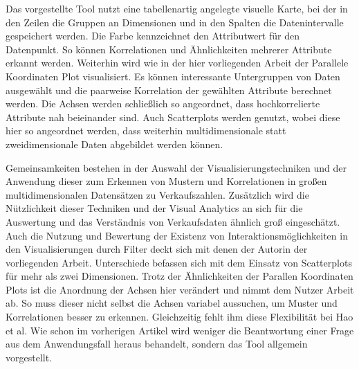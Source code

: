 \documentclass[usegeometry=true]{scrartcl}
\begin{document}
Das vorgestellte Tool nutzt eine tabellenartig angelegte visuelle Karte, bei der in den Zeilen die Gruppen an Dimensionen und in den Spalten die Datenintervalle gespeichert werden.
Die Farbe kennzeichnet den Attributwert für den Datenpunkt. So können Korrelationen und Ähnlichkeiten mehrerer Attribute erkannt werden.
Weiterhin wird wie in der hier vorliegenden Arbeit der Parallele Koordinaten Plot visualisiert. 
Es können interessante Untergruppen von Daten ausgewählt und die paarweise Korrelation der gewählten Attribute berechnet werden. 
Die Achsen werden schließlich so angeordnet, dass hochkorrelierte Attribute nah beieinander sind. 
Auch Scatterplots werden genutzt, wobei diese hier so angeordnet werden, dass weiterhin multidimensionale statt zweidimensionale Daten abgebildet werden können.

Gemeinsamkeiten bestehen in der Auswahl der Visualisierungstechniken und der Anwendung dieser zum Erkennen von Mustern und Korrelationen in großen multidimensionalen Datensätzen zu Verkaufszahlen.
Zusätzlich wird die Nützlichkeit dieser Techniken und der Visual Analytics an sich für die Auswertung und das Verständnis von Verkaufsdaten ähnlich groß eingeschätzt.
Auch die Nutzung und Bewertung der Existenz von Interaktionsmöglichkeiten in den Visualisierungen durch Filter deckt sich mit denen der Autorin der vorliegenden Arbeit.
Unterschiede befassen sich mit dem Einsatz von Scatterplots für mehr als zwei Dimensionen.
Trotz der Ähnlichkeiten der Parallen Koordinaten Plots ist die Anordnung der Achsen hier verändert und nimmt dem Nutzer Arbeit ab. 
So muss dieser nicht selbst die Achsen variabel aussuchen, um Muster und Korrelationen besser zu erkennen. 
Gleichzeitig fehlt ihm diese Flexibilität bei Hao et al.
Wie schon im vorherigen Artikel wird weniger die Beantwortung einer Frage aus dem Anwendungsfall heraus behandelt, sondern das Tool allgemein vorgestellt.
\end{document}
